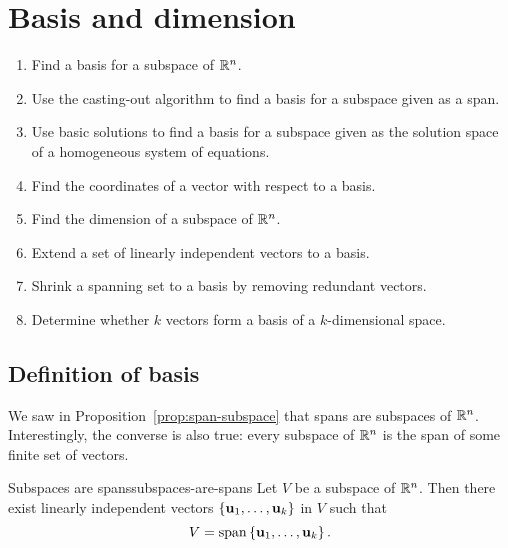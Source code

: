 \section{Basis and dimension}
\label{sec:basis-and-dimension}

\begin{outcome}
  \begin{enumerate}\setlength\itemsep{0em}
  \item Find a basis for a subspace of $\mathbb{R}^n$.
  \item Use the casting-out algorithm to find a basis for a subspace
    given as a span.
  \item Use basic solutions to find a basis for a subspace given as
    the solution space of a homogeneous system of equations.
  \item Find the coordinates of a vector with respect to a basis.
  \item Find the dimension of a subspace of $\mathbb{R}^n$.
  \item Extend a set of linearly independent vectors to a basis.
  \item Shrink a spanning set to a basis by removing redundant vectors.
  \item Determine whether $k$ vectors form a basis of a $k$-dimensional
    space.
  \end{enumerate}
\end{outcome}

\subsection{Definition of basis}

We saw in Proposition~\ref{prop:span-subspace} that spans are
subspaces of\/ $\mathbb{R}^n$. Interestingly, the converse is also true: every
subspace of\/ $\mathbb{R}^n$ is the span of some finite set of vectors.

\begin{theorem}{Subspaces are spans}{subspaces-are-spans}
  Let $V$ be a subspace of\/ $\mathbb{R}^n$. Then there exist linearly
  independent vectors $\set{\vect{u}_1,\ldots,\vect{u}_k}$ in $V$
  such that
  \begin{equation*}
    V= \sspan\set{\vect{u}_1,\ldots,\vect{u}_k}.
  \end{equation*}
  \vspace{-3ex}
\end{theorem}

